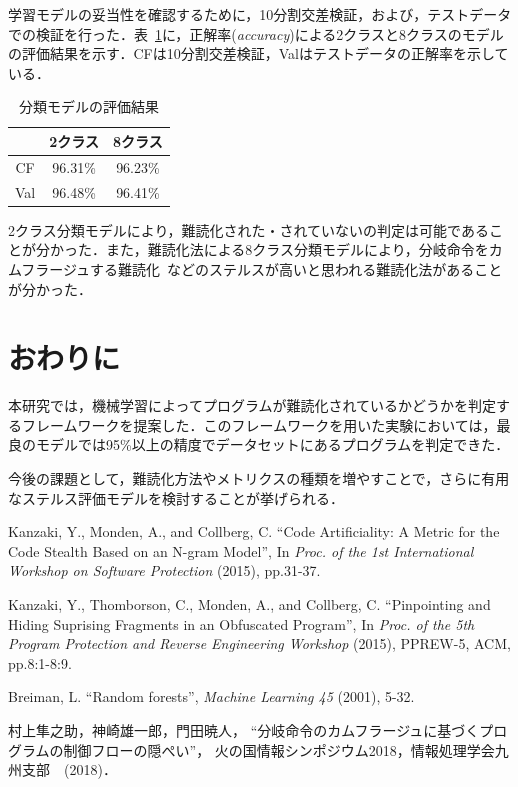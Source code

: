 \documentclass[twocolumn,11pt]{jsarticle}
\newcommand\doubleRule{\toprule\toprule}
\begin{document}
学習モデルの妥当性を確認するために，10分割交差検証，および，テストデータでの検証を行った．表~\ref{table:result}に，正解率(\textit{accuracy})による2クラスと8クラスのモデルの評価結果を示す．CFは10分割交差検証，Valはテストデータの正解率を示している．

\begin{table}[!h]
\centering
\caption{分類モデルの評価結果}
\label{table:result}
\begin{tabular}{c|c|c}
\doubleRule
& 2クラス & 8クラス \\\hline
CF & 96.31\% & 96.23\% \\
Val & 96.48\% & 96.41\% \\
\bottomrule
\end{tabular}
\end{table}


2クラス分類モデルにより，難読化された・されていないの判定は可能であることが分かった．また，難読化法による8クラス分類モデルにより，分岐命令をカムフラージュする難読化~\cite{jmp-obf}などのステルスが高いと思われる難読化法があることが分かった．

\section{おわりに}
本研究では，機械学習によってプログラムが難読化されているかどうかを判定するフレームワークを提案した．このフレームワークを用いた実験においては，最良のモデルでは95\%以上の精度でデータセットにあるプログラムを判定できた．

今後の課題として，難読化方法やメトリクスの種類を増やすことで，さらに有用なステルス評価モデルを検討することが挙げられる．

{
\begin{thebibliography}{9}

Kanzaki, Y., Monden, A., and Collberg, C.
``Code Artificiality: A Metric for the Code Stealth Based on an N-gram Model'',
In \textit{Proc. of the 1st International Workshop on Software Protection} (2015), pp.31-37.

Kanzaki, Y., Thomborson, C., Monden, A., and Collberg, C.
``Pinpointing and Hiding Suprising Fragments in an Obfuscated Program'',
In \textit{Proc. of the 5th Program Protection and Reverse Engineering Workshop} (2015), PPREW-5, ACM, pp.8:1-8:9.

Breiman, L.
``Random forests'',
\textit{Machine Learning 45} (2001), 5-32.

村上隼之助，神崎雄一郎，門田暁人， 
``分岐命令のカムフラージュに基づくプログラムの制御フローの隠ぺい''，
火の国情報シンポジウム2018，情報処理学会九州支部　(2018)．

\end{thebibliography}
}
\end{document}
